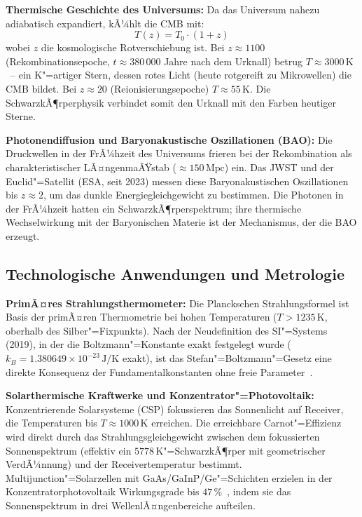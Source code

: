 ﻿\documentclass[a4paper,12pt]{article}
\theoremstyle{definition}
\begin{document}
\textbf{Thermische Geschichte des Universums:}
Da das Universum nahezu adiabatisch expandiert, kÃ¼hlt die CMB mit:
\[
    T(z) = T_0 \cdot (1 + z)
\]
wobei $z$ die kosmologische Rotverschiebung ist. Bei $z \approx 1100$
(Rekombinationsepoche, $t \approx 380\,000$ Jahre nach dem Urknall)
betrug $T \approx 3000\,\text{K}$~-- ein K"=artiger Stern, dessen rotes
Licht (heute rotgereift zu Mikrowellen) die CMB bildet. Bei $z \approx 20$
(Reionisierungsepoche) $T \approx 55\,\text{K}$. Die SchwarzkÃ¶rperphysik
verbindet somit den Urknall mit den Farben heutiger Sterne.

\textbf{Photonendiffusion und Baryonakustische Oszillationen (BAO):}
Die Druckwellen in der FrÃ¼hzeit des Universums frieren bei der
Rekombination als charakteristischer LÃ¤ngenmaÃŸstab ($\approx 150\,\text{Mpc}$)
ein. Das JWST und der Euclid"=Satellit (ESA, seit 2023) messen diese
Baryonakustischen Oszillationen bis $z \approx 2$, um das dunkle
Energiegleichgewicht zu bestimmen. Die Photonen in der FrÃ¼hzeit hatten
ein SchwarzkÃ¶rperspektrum; ihre thermische Wechselwirkung mit der
Baryonischen Materie ist der Mechanismus, der die BAO erzeugt.

\subsection{Technologische Anwendungen und Metrologie}

\textbf{PrimÃ¤res Strahlungsthermometer:}
Die Planckschen Strahlungsformel ist Basis der primÃ¤ren Thermometrie
bei hohen Temperaturen ($T > 1235\,\text{K}$, oberhalb des
Silber"=Fixpunkts). Nach der Neudefinition des SI"=Systems (2019),
in der die Boltzmann"=Konstante exakt festgelegt wurde
($k_B = 1.380649 \times 10^{-23}\,\text{J/K}$ exakt), ist das
Stefan"=Boltzmann"=Gesetz eine direkte Konsequenz der Fundamentalkonstanten
ohne freie Parameter~\cite{nist2019}.

\textbf{Solarthermische Kraftwerke und Konzentrator"=Photovoltaik:}
Konzentrierende Solarsysteme (CSP) fokussieren das Sonnenlicht auf Receiver,
die Temperaturen bis $T \approx 1000\,\text{K}$ erreichen. Die
erreichbare Carnot"=Effizienz wird direkt durch das Strahlungsgleichgewicht
zwischen dem fokussierten Sonnenspektrum (effektiv ein $5778\,\text{K}$"=SchwarzkÃ¶rper
mit geometrischer VerdÃ¼nnung) und der Receivertemperatur bestimmt.
Multijunction"=Solarzellen mit GaAs/GaInP/Ge"=Schichten erzielen
in der Konzentratorphotovoltaik Wirkungsgrade bis $47\,\%$~\cite{green2023},
indem sie das Sonnenspektrum in drei WellenlÃ¤ngenbereiche aufteilen.
\end{document}

